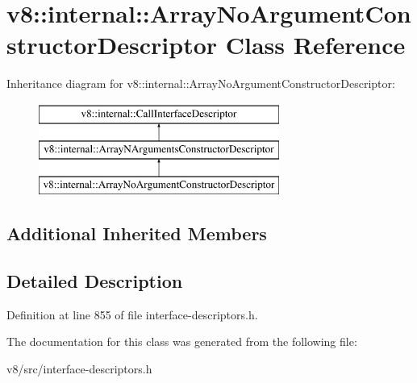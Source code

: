 \hypertarget{classv8_1_1internal_1_1ArrayNoArgumentConstructorDescriptor}{}\section{v8\+:\+:internal\+:\+:Array\+No\+Argument\+Constructor\+Descriptor Class Reference}
\label{classv8_1_1internal_1_1ArrayNoArgumentConstructorDescriptor}
Inheritance diagram for v8\+:\+:internal\+:\+:Array\+No\+Argument\+Constructor\+Descriptor\+:\begin{figure}[H]
\begin{center}
\leavevmode
\includegraphics[height=3.000000cm]{classv8_1_1internal_1_1ArrayNoArgumentConstructorDescriptor}
\end{center}
\end{figure}
\subsection*{Additional Inherited Members}


\subsection{Detailed Description}


Definition at line 855 of file interface-\/descriptors.\+h.



The documentation for this class was generated from the following file\+:\begin{DoxyCompactItemize}
\item 
v8/src/interface-\/descriptors.\+h\end{DoxyCompactItemize}
